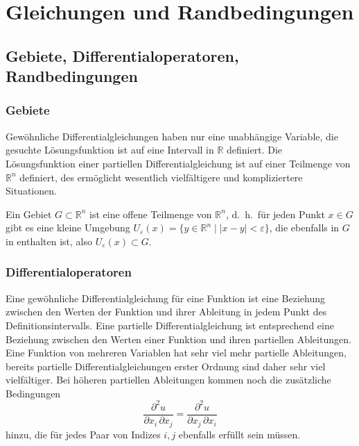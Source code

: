 %
%
%
\section{Gleichungen und Randbedingungen
\label{buch:pde:section:gleichungen-und-randbedingungen}}

\subsection{Gebiete, Differentialoperatoren, Randbedingungen}


\subsubsection{Gebiete}
Gewöhnliche Differentialgleichungen haben nur eine unabhängige
Variable, die gesuchte Lösungsfunktion ist auf eine 
Intervall in $\mathbb{R}$ definiert.
Die Lösungsfunktion einer partiellen Differentialgleichung
ist auf einer Teilmenge von $\mathbb{R}^n$ definiert, des 
ermöglicht wesentlich vielfältigere und kompliziertere
Situationen.

\begin{definition}
Ein Gebiet $G\subset\mathbb{R}^n$ ist eine offene Teilmenge
von $\mathbb{R}^n$, d.~h.~für jeden Punkt $x\in G$ gibt es
eine kleine Umgebung
\(
U_{\varepsilon}(x)
=
\{y\in\mathbb{R}^n\mid |x-y|<\varepsilon\}
\), die ebenfalls in $G$ in enthalten ist,
also $U_{\varepsilon}(x)\subset G$.
\end{definition}

\subsubsection{Differentialoperatoren}
Eine gewöhnliche Differentialgleichung für eine Funktion
ist eine Beziehung zwischen den Werten der Funktion und ihrer
Ableitung in jedem Punkt des Definitionsintervalls.
Eine partielle Differentialgleichung ist entsprechend eine
Beziehung zwischen den Werten einer Funktion und ihren partiellen
Ableitungen.
Eine Funktion von mehreren Variablen hat sehr viel mehr partielle
Ableitungen, bereits partielle Differentialgleichungen erster
Ordnung sind daher sehr viel vielfältiger.
Bei höheren partiellen Ableitungen kommen noch die zusätzliche Bedingungen
\[
\frac{\partial^2 u}{\partial x_i\,\partial x_j}
=
\frac{\partial^2 u}{\partial x_j\,\partial x_i}
\]
hinzu, die für jedes Paar von Indizes $i,j$ ebenfalls erfüllt sein
müssen.


